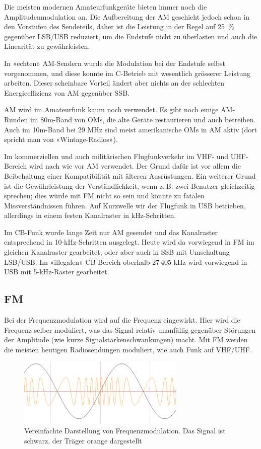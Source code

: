Die meisten modernen Amateurfunkgeräte bieten immer noch die Amplitudenmodulation an. Die Aufbereitung der AM geschieht jedoch schon in den Vorstufen des Sendeteils, daher ist die Leistung in der Regel auf 25 \% gegenüber LSB/USB reduziert, um die Endstufe nicht zu überlasten und auch die Linearität zu gewährleisten.

In «echten» AM-Sendern wurde die Modulation bei der Endstufe selbst vorgenommen, und diese konnte im C-Betrieb mit wesentlich grösserer Leistung arbeiten. Dieser scheinbare Vorteil ändert aber nichts an der schlechten Energieeffizienz von AM gegenüber SSB.

AM wird im Amateurfunk kaum noch verwendet. Es gibt noch einige AM-Runden im 80m-Band von OMs, die alte Geräte restaurieren und auch betreiben. Auch im 10m-Band bei 29 MHz sind meist amerikanische OMs in AM aktiv (dort spricht man von «Wintage-Radios»).

Im kommerziellen und auch militärischen Flugfunkverkehr im VHF- und UHF-Bereich wird nach wie vor AM verwendet. Der Grund dafür ist vor allem die Beibehaltung einer Kompatibilität mit älteren Ausrüstungen. Ein weiterer Grund ist die Gewährleistung der Verständlichkeit, wenn z. B. zwei Benutzer gleichzeitig sprechen; dies würde mit FM nicht so sein und könnte zu fatalen Missverständnissen führen. Auf Kurzwelle wir der Flugfunk in USB betrieben, allerdings in einem festen Kanalraster in kHz-Schritten.

Im CB-Funk wurde lange Zeit nur AM gesendet und das Kanalraster entsprechend in 10-kHz-Schritten ausgelegt. Heute wird da vorwiegend in FM im gleichen Kanalraster gearbeitet, oder aber auch in SSB mit Umschaltung LSB/USB. Im «illegalen» CB-Bereich oberhalb 27 405 kHz wird vorwiegend in USB mit 5-kHz-Raster gearbeitet.

\subsection{FM}
Bei der Frequenzmodulation wird auf die Frequenz eingewirkt. Hier wird die Frequenz selber moduliert, was das Signal relativ unanfällig gegenüber Störungen der Amplitude (wie kurze Signalstärkenschwankungen) macht. Mit FM werden die meisten heutigen Radiosendungen moduliert, wie auch Funk auf VHF/UHF.

\begin{figure}[h!]
 \centering
 \includegraphics[width=8cm]{./png/Graph_FM.png}
 \caption{Vereinfachte Darstellung von Frequenzmodulation. Das Signal ist schwarz, der Träger orange dargestellt}
 \label{fig:fm}
\end{figure}


